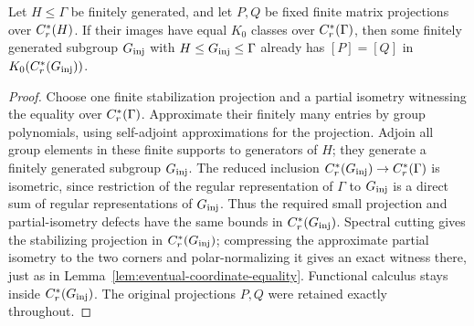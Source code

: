 \begin{lemma}
\label{lem:finite-subgroup-witness}
Let $H\le\Gamma$ be finitely generated, and let $P,Q$ be fixed finite matrix
projections over $C_r^*(H)$.  If their images have equal $K_0$ classes over
$C_r^*(\Gamma)$, then some finitely generated subgroup $G_{\mathrm{inj}}$ with
$H\le G_{\mathrm{inj}}\le\Gamma$ already has $[P]=[Q]$ in $K_0(C_r^*(G_{\mathrm{inj}}))$.
\end{lemma}

\begin{proof}
Choose one finite stabilization projection and a partial isometry witnessing
the equality over $C_r^*(\Gamma)$.  Approximate their finitely many entries
by group polynomials, using self-adjoint approximations for the projection.
Adjoin all group elements in these finite supports to generators of $H$;
they generate a finitely generated subgroup $G_{\mathrm{inj}}$.  The reduced inclusion
$C_r^*(G_{\mathrm{inj}})\to C_r^*(\Gamma)$ is isometric, since restriction of the regular
representation of $\Gamma$ to $G_{\mathrm{inj}}$ is a direct sum of regular representations
of $G_{\mathrm{inj}}$.  Thus the required small projection and partial-isometry defects have
the same bounds in $C_r^*(G_{\mathrm{inj}})$.  Spectral cutting gives the stabilizing
projection in $C_r^*(G_{\mathrm{inj}})$; compressing the approximate partial isometry to
the two corners and polar-normalizing it gives an exact witness there, just
as in Lemma~\ref{lem:eventual-coordinate-equality}.  Functional calculus
stays inside $C_r^*(G_{\mathrm{inj}})$.  The original projections $P,Q$ were retained
exactly throughout.
\end{proof}

